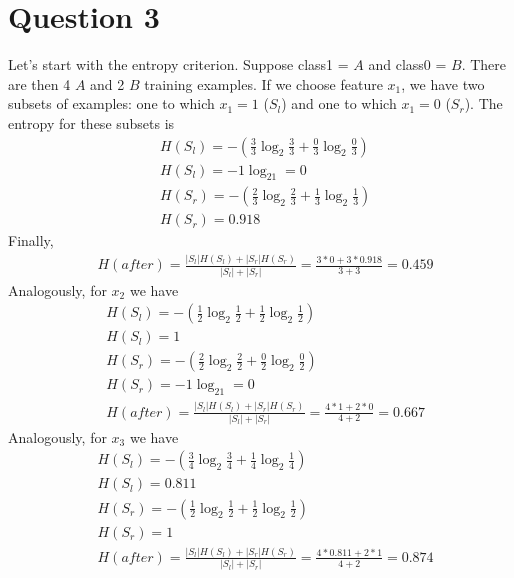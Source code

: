 \documentclass[leqno]{article}
\begin{document}
\section*{Question 3} Let's start with the entropy criterion. Suppose class1 = $A$ and class0 = $B$. 
There are then 4 $A$ and 2 $B$ training examples. If we choose feature $x_1$, we have two 
subsets of examples: one to which $x_1 = 1$ ($S_l$) and one to which $x_1 = 0$ ($S_r$). The entropy for these 
subsets is 
\begin{equation*}
\begin{split}
&H(S_l) = -(\frac{3}{3}\log_2\frac{3}{3} + \frac{0}{3}\log_2\frac{0}{3}) \\
&H(S_l) = -1\log_21 = 0\\
&H(S_r) = -(\frac{2}{3}\log_2\frac{2}{3} + \frac{1}{3}\log_2\frac{1}{3}) \\
&H(S_r) = 0.918
\end{split}
\end{equation*}
Finally,
\begin{equation*}
\begin{split}
&H(after) = \frac{|S_l|H(S_l) + |S_r|H(S_r)}{|S_l| + |S_r|} = \frac{3*0 + 3*0.918}{3 + 3} = 0.459
\end{split}
\end{equation*} 
Analogously, for $x_2$ we have
\begin{equation*}
\begin{split}
&H(S_l) = -(\frac{1}{2}\log_2\frac{1}{2} + \frac{1}{2}\log_2\frac{1}{2}) \\
&H(S_l) = 1\\
&H(S_r) = -(\frac{2}{2}\log_2\frac{2}{2} + \frac{0}{2}\log_2\frac{0}{2})\\
&H(S_r) = -1\log_21 = 0\\
&H(after) = \frac{|S_l|H(S_l) + |S_r|H(S_r)}{|S_l| + |S_r|} = \frac{4*1 + 2*0}{4 + 2} = 0.667
\end{split}
\end{equation*}
Analogously, for $x_3$ we have
\begin{equation*}
\begin{split}
&H(S_l) = -(\frac{3}{4}\log_2\frac{3}{4} + \frac{1}{4}\log_2\frac{1}{4}) \\
&H(S_l) = 0.811\\
&H(S_r) = -(\frac{1}{2}\log_2\frac{1}{2} + \frac{1}{2}\log_2\frac{1}{2})\\
&H(S_r) = 1\\
&H(after) = \frac{|S_l|H(S_l) + |S_r|H(S_r)}{|S_l| + |S_r|} = \frac{4*0.811 + 2*1}{4 + 2} = 0.874
\end{split}
\end{equation*}
\end{document}
